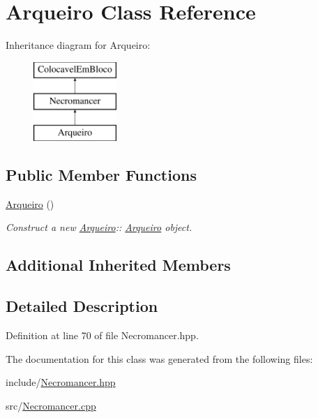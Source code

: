 \hypertarget{class_arqueiro}{}\section{Arqueiro Class Reference}
\label{class_arqueiro}
Inheritance diagram for Arqueiro\+:\begin{figure}[H]
\begin{center}
\leavevmode
\includegraphics[height=3.000000cm]{class_arqueiro}
\end{center}
\end{figure}
\subsection*{Public Member Functions}
\begin{DoxyCompactItemize}
\item 
\mbox{\label{class_arqueiro_a5b2f58461e4f228fc319a1ec872c175d}} 
\mbox{\hyperlink{class_arqueiro_a5b2f58461e4f228fc319a1ec872c175d}{Arqueiro}} ()
\begin{DoxyCompactList}\small\item\em Construct a new \mbox{\hyperlink{class_arqueiro}{Arqueiro}}\+:\+: \mbox{\hyperlink{class_arqueiro}{Arqueiro}} object. \end{DoxyCompactList}\end{DoxyCompactItemize}
\subsection*{Additional Inherited Members}


\subsection{Detailed Description}


Definition at line 70 of file Necromancer.\+hpp.



The documentation for this class was generated from the following files\+:\begin{DoxyCompactItemize}
\item 
include/\mbox{\hyperlink{_necromancer_8hpp}{Necromancer.\+hpp}}\item 
src/\mbox{\hyperlink{_necromancer_8cpp}{Necromancer.\+cpp}}\end{DoxyCompactItemize}
